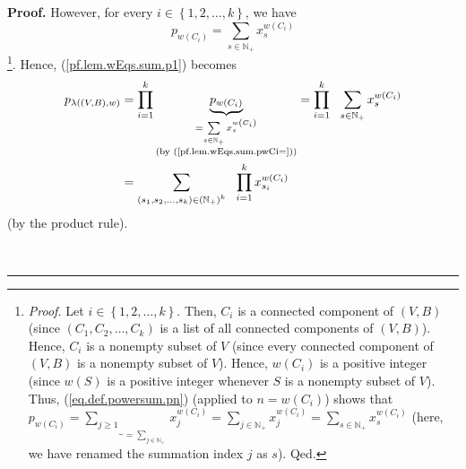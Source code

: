 \documentclass[numbers=enddot,12pt,final,onecolumn,notitlepage]{scrartcl}%
\theoremstyle{definition}
\newenvironment{proof}[1][Proof]{\noindent\textbf{#1.} }{\ \rule{0.5em}{0.5em}}
\newenvironment{verlong}{}{}
\let\sumnonlimits\sum
\let\prodnonlimits\prod
\renewcommand{\sum}{\sumnonlimits\limits}
\renewcommand{\prod}{\prodnonlimits\limits}
\begin{document}
\begin{verlong}
\begin{proof}
However, for every $i\in\left\{  1,2,\ldots,k\right\}  $, we have%
\begin{equation}
p_{w\left(  C_{i}\right)  }=\sum_{s\in\mathbb{N}_{+}}x_{s}^{w\left(
C_{i}\right)  } \label{pf.lem.wEqs.sum.pwCi=}%
\end{equation}
\footnote{\textit{Proof.} Let $i\in\left\{  1,2,\ldots,k\right\}  $. Then,
$C_{i}$ is a connected component of $\left(  V,B\right)  $ (since $\left(
C_{1},C_{2},\ldots,C_{k}\right)  $ is a list of all connected components of
$\left(  V,B\right)  $). Hence, $C_{i}$ is a nonempty subset of $V$ (since
every connected component of $\left(  V,B\right)  $ is a nonempty subset of
$V$). Hence, $w\left(  C_{i}\right)  $ is a positive integer (since $w\left(
S\right)  $ is a positive integer whenever $S$ is a nonempty subset of $V$).
Thus, (\ref{eq.def.powersum.pn}) (applied to $n=w\left(  C_{i}\right)  $)
shows that $p_{w\left(  C_{i}\right)  }=\underbrace{\sum_{j\geq1}}%
_{=\sum_{j\in\mathbb{N}_{+}}}x_{j}^{w\left(  C_{i}\right)  }=\sum
_{j\in\mathbb{N}_{+}}x_{j}^{w\left(  C_{i}\right)  }=\sum_{s\in\mathbb{N}_{+}%
}x_{s}^{w\left(  C_{i}\right)  }$ (here, we have renamed the summation index
$j$ as $s$). Qed.}. Hence, (\ref{pf.lem.wEqs.sum.p1}) becomes%
\begin{align}
p_{\lambda\left(  \left(  V,B\right)  ,w\right)  }  &  =\prod_{i=1}%
^{k}\underbrace{p_{w\left(  C_{i}\right)  }}_{\substack{=\sum_{s\in
\mathbb{N}_{+}}x_{s}^{w\left(  C_{i}\right)  }\\\text{(by
(\ref{pf.lem.wEqs.sum.pwCi=}))}}}=\prod_{i=1}^{k}\ \ \sum_{s\in\mathbb{N}_{+}%
}x_{s}^{w\left(  C_{i}\right)  }\nonumber\\
&  =\sum_{\left(  s_{1},s_{2},\ldots,s_{k}\right)  \in\left(  \mathbb{N}%
_{+}\right)  ^{k}}\ \ \prod_{i=1}^{k}x_{s_{i}}^{w\left(  C_{i}\right)  }
\label{pf.lem.wEqs.sum.p2}%
\end{align}
(by the product rule).


\end{proof}
\end{verlong}
\end{document}
